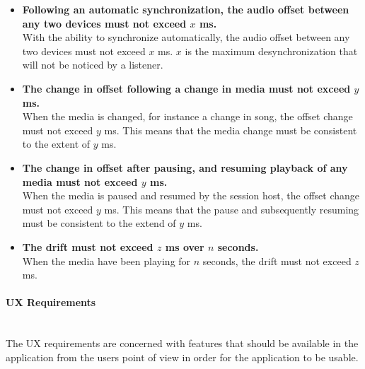 \begin{eletterate}
    \begin{itemize}
        \item \textbf{Following an automatic synchronization, the audio offset between any two devices must not exceed $x$ ms.} \hfill\\
            With the ability to synchronize automatically, the audio offset between any two devices must not exceed $x$ ms.
            $x$ is the maximum desynchronization that will not be noticed by a listener.

        \item \textbf{The change in offset following a change in media must not exceed $y$ ms.} \hfill\\
            When the media is changed, for instance a change in song, the offset change must not exceed $y$ ms.
            This means that the media change must be consistent to the extent of $y$ ms.

        \item \textbf{The change in offset after pausing, and resuming playback of any media must not exceed $y$ ms.} \hfill\\
            When the media is paused and resumed by the session host, the offset change must not exceed $y$ ms.
            This means that the pause and subsequently resuming must be consistent to the extend of $y$ ms.

        \item \textbf{The drift must not exceed $z$ ms over $n$ seconds.} \hfill\\
            When the media have been playing for $n$ seconds, the drift must not exceed $z$ ms.
    \end{itemize}
\end{eletterate}

\paragraph{\ac{UX} Requirements} \hfill\\
The \ac{UX} requirements are concerned with features that should be available in the application from the users point of view in order for the application to be usable.


